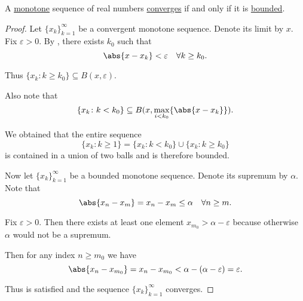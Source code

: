 \begin{proposition}\label{thm:real_monotone_sequence_converges_iff_bounded}
  A \hyperref[def:preordered_set/homomorphism]{monotone} sequence of real numbers \hyperref[def:net_convergence/limit]{converges} if and only if it is \hyperref[def:metric_space/bounded_sequence]{bounded}.
\end{proposition}
\begin{proof}
  \SufficiencySubProof Let \( \{ x_k \}_{k=1}^\infty \) be a convergent monotone sequence. Denote its limit by \( x \). Fix \( \varepsilon > 0 \). By , there exists \( k_0 \) such that
  \begin{equation*}
    \abs{x - x_k} < \varepsilon \quad\forall k \geq k_0.
  \end{equation*}

  Thus \( \{ x_k \colon k \geq k_0 \} \subseteq B(x, \varepsilon) \).

  Also note that
  \begin{equation*}
    \{ x_k \colon k < k_0 \} \subseteq B(x, \max_{i < k_0} \{ \abs{x - x_k} \}).
  \end{equation*}

  We obtained that the entire sequence
  \begin{equation*}
    \{ x_k \colon k \geq 1 \} = \{ x_k \colon k < k_0 \} \cup \{ x_k \colon k \geq k_0 \}
  \end{equation*}
  is contained in a union of two balls and is therefore bounded.

  \NecessitySubProof Now let \( \{ x_k \}_{k=1}^\infty \) be a bounded monotone sequence. Denote its supremum by \( \alpha \). Note that
  \begin{equation*}
    \abs{x_n - x_m} = x_n - x_m \leq \alpha \quad\forall n \geq m.
  \end{equation*}

  Fix \( \varepsilon > 0 \). Then there exists at least one element \( x_{m_0} > \alpha - \varepsilon \) because otherwise \( \alpha \) would not be a supremum.

  Then for any index \( n \geq m_0 \) we have
  \begin{equation*}
    \abs{x_n - x_{m_0}} = x_n - x_{m_0} < \alpha - (\alpha - \varepsilon) = \varepsilon.
  \end{equation*}

  Thus  is satisfied and the sequence \( \{ x_k \}_{k=1}^\infty \) converges.
\end{proof}
